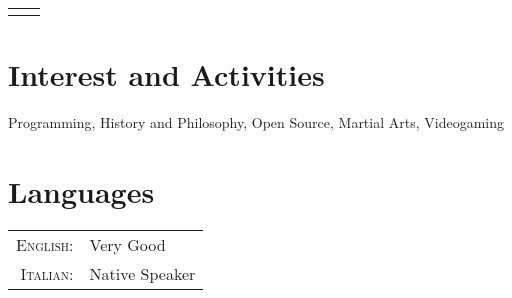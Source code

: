 \documentclass[10pt]{article} %
\begin{document}
\begin{paracol}{2}
\begin{supertabular}{rl}

	
\end{supertabular}


\section{Interest and Activities}

\large Programming, History and Philosophy, Open Source, Martial Arts, Videogaming

\medskip %


\section{Languages}

\begin{tabular}{rl}
	\textsc{English:} & Very Good\\
	
	\textsc{Italian:} & Native Speaker\\
	
\end{tabular}

\medskip %


\end{paracol}

\end{document}
